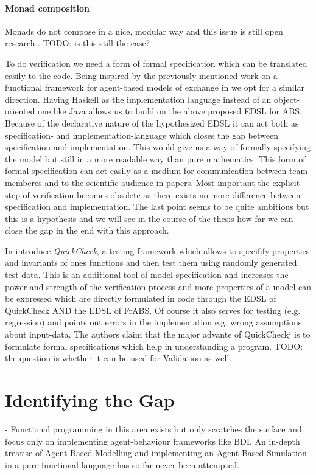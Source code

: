 \paragraph{Monad composition}
Monads do not compose in a nice, modular way and this issue is still open research \cite{hudak_history_2007}. TODO: is this still the case?

To do verification we need a form of formal specification which can be translated easily to the code. Being inspired by the previously mentioned work on a functional framework for agent-based models of exchange in \cite{botta_functional_2011} we opt for a similar direction. Having Haskell as the implementation language instead of an object-oriented one like Java allows us to build on the above proposed EDSL for ABS. Because of the declarative nature of the hypothesized EDSL it can act both as specification- and implementation-language which closes the gap between specification and implementation. This would give us a way of formally specifying the model but still in a more readable way than pure mathematics. This form of formal specification can act easily as a medium for communication between team-memberes and to the scientific audience in papers. Most important the explicit step of verification becomes obsolete as there exists no more difference between specification and implementation. The last point seems to be quite ambitious but this is a hypothesis and we will see in the course of the thesis how far we can close the gap in the end with this approach.

In \cite{claessen_quickcheck:_2000} introduce \textit{QuickCheck}, a testing-framework which allows to specifify properties and invariants of ones functions and then test them using randomly generated test-data. This is an additional tool of model-specification and increases the power and strength of the verification process and more properties of a model can be expressed which are directly formulated in code through the EDSL of QuickCheck AND the EDSL of FrABS. Of course it also serves for testing (e.g. regression) and points out errors in the implementation e.g. wrong assumptions about input-data. The authors claim that the major advante of QuickCheckj is to formulate formal specifications which help in understanding a program.
TODO: the question is whether it can be used for Validation as well.



\section{Identifying the Gap}
- Functional programming in this area exists but only scratches the surface and focus only on implementing agent-behaviour frameworks like BDI. An in-depth treatise of Agent-Based Modelling and implementing an Agent-Based Simulation in a pure functional language has so far never been attempted.

